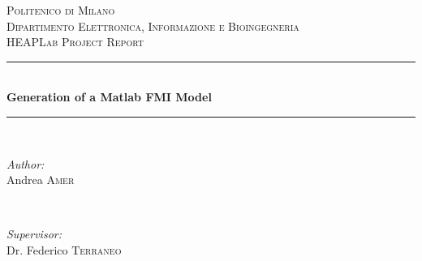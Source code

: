 \begin{titlepage}

\newcommand{\HRule}{\rule{\linewidth}{0.5mm}} %

\center %
 

\textsc{\LARGE Politenico di Milano}\\[1.5cm] %
\textsc{\Large Dipartimento Elettronica, Informazione e Bioingegneria}\\[0.5cm] %
\textsc{\large HEAPLab Project Report}\\[0.5cm] %


\HRule \\[0.4cm]
{ \huge \bfseries Generation of a Matlab FMI Model }\\[0.4cm] %
\HRule \\[1.5cm]
 

\begin{minipage}{0.4\textwidth}
\begin{flushleft} \large
\emph{Author:}\\
Andrea \textsc{Amer} %
\end{flushleft}
\end{minipage}
~
\begin{minipage}{0.4\textwidth}
\begin{flushright} \large
\emph{Supervisor:} \\
Dr. Federico \textsc{Terraneo} %
\end{flushright}
\end{minipage}\\[2cm]



\end{titlepage}

